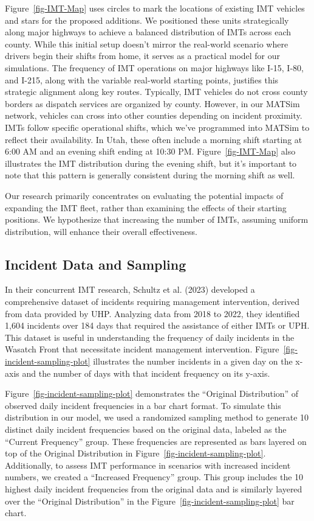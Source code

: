 \documentclass[fancy, oneside, mastersfancy, ms]{byuthesis}
\begin{document}
Figure~\ref{fig-IMT-Map} uses circles to mark the locations of existing
IMT vehicles and stars for the proposed additions. We positioned these
units strategically along major highways to achieve a balanced
distribution of IMTs across each county. While this initial setup
doesn't mirror the real-world scenario where drivers begin their shifts
from home, it serves as a practical model for our simulations. The
frequency of IMT operations on major highways like I-15, I-80, and
I-215, along with the variable real-world starting points, justifies
this strategic alignment along key routes. Typically, IMT vehicles do
not cross county borders as dispatch services are organized by county.
However, in our MATSim network, vehicles can cross into other counties
depending on incident proximity. IMTs follow specific operational
shifts, which we've programmed into MATSim to reflect their
availability. In Utah, these often include a morning shift starting at
6:00 AM and an evening shift ending at 10:30 PM.
Figure~\ref{fig-IMT-Map} also illustrates the IMT distribution during
the evening shift, but it's important to note that this pattern is
generally consistent during the morning shift as well.

Our research primarily concentrates on evaluating the potential impacts
of expanding the IMT fleet, rather than examining the effects of their
starting positions. We hypothesize that increasing the number of IMTs,
assuming uniform distribution, will enhance their overall effectiveness.

\hypertarget{sec-inc_data}{%
\subsection{Incident Data and Sampling}\label{sec-inc_data}}

In their concurrent IMT research, Schultz et al. (2023) developed a
comprehensive dataset of incidents requiring management intervention,
derived from data provided by UHP. Analyzing data from 2018 to 2022,
they identified 1,604 incidents over 184 days that required the
assistance of either IMTs or UPH. This dataset is useful in
understanding the frequency of daily incidents in the Wasatch Front that
necessitate incident management intervention.
Figure~\ref{fig-incident-sampling-plot} illustrates the number incidents
in a given day on the x-axis and the number of days with that incident
frequency on its y-axis.

Figure~\ref{fig-incident-sampling-plot} demonstrates the ``Original
Distribution'' of observed daily incident frequencies in a bar chart
format. To simulate this distribution in our model, we used a randomized
sampling method to generate 10 distinct daily incident frequencies based
on the original data, labeled as the ``Current Frequency'' group. These
frequencies are represented as bars layered on top of the Original
Distribution in Figure~\ref{fig-incident-sampling-plot}. Additionally,
to assess IMT performance in scenarios with increased incident numbers,
we created a ``Increased Frequency'' group. This group includes the 10
highest daily incident frequencies from the original data and is
similarly layered over the ``Original Distribution'' in the
Figure~\ref{fig-incident-sampling-plot} bar chart.
\end{document}
